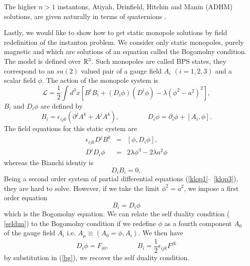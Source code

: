 \documentclass[a4paper,12pt]{book}
\begin{document}
The higher $n>1$ instantons, Atiyah, Drinfield, Hitchin and Manin (ADHM)
solutions, are given naturally in terms of quaternions \cite{adhm}.

Lastly, we would like to show how to get static monopole solutions by field
redefinition of the instanton problem. We consider only static monopoles,
purely magnetic and which are solutions of an equation called the Bogomolny
condition\cite{nash}. The model is defined over $\Bbb{R}^{3}$. Such
monopoles are called BPS states, they correspond to an $su\left( 2\right) $
valued pair of a gauge field $A_{i}$ $\left( i=1,2,3\right) $ and a scalar
field $\phi $. The action of the monopole system is 
\begin{equation}
\mathcal{L}=\frac{1}{2}\int d^{3}x\left[ B^{i}B_{i}+\left( D_{i}\phi \right)
\left( D^{i}\phi \right) -\lambda \left( \phi ^{2}-a^{2}\right) ^{2}\right] ,
\end{equation}
$B_{i}$ and $D_{i}\phi $ are defined by 
\begin{equation}
B_{i}=\epsilon _{ijk}\left( \partial ^{j}A^{k}+A^{j}A^{k}\right)
,\;\;\;\;\;\;\;\;\;\;\;\;\;\;\;D_{i}\phi =\partial _{i}\phi +\left[
A_{i},\phi \right] .
\end{equation}
The field equations for this static system are 
\begin{eqnarray}
\epsilon _{ijk}D^{j}B^{k} &=&\left[ \phi ,D_{i}\phi \right] ,  \label{klop1}
\\
D^{i}D_{i}\phi &=&2\lambda \phi ^{3}-2\lambda a^{2}\phi  \label{klop2}
\end{eqnarray}
whereas the Bianchi identiy is 
\begin{equation}
D_{i}B_{i}=0,  \label{klop3}
\end{equation}
Being a second order system of partial differential equations (\ref{klop1}--%
\ref{klop3}), they are hard to solve. However, if we take the limit $\phi
^{2}=a^{2}$, we impose a first order equation 
\begin{equation}
B_{i}=D_{i}\phi  \label{bg}
\end{equation}
which is the Bogomolny equation. We can relate the self duality condition (%
\ref{seldua}) to the Bogomolny condition if we redefine $\phi $ as a fourth
component $A_{0}$ of the gauge field $A_{i}$ i.e. $A_{\mu }\equiv \left(
A_{0}=\phi ,A_{i}\right) $. We then have 
\begin{equation}
D_{i}\phi =F_{i0},\;\;\;\;\;\;\;\;\;\;\;\;\;\;\;B_{i}=\frac{1}{2}\epsilon
_{ijk}F^{jk}
\end{equation}
by substitution in (\ref{bg}), we recover the self duality condition.
\end{document}
